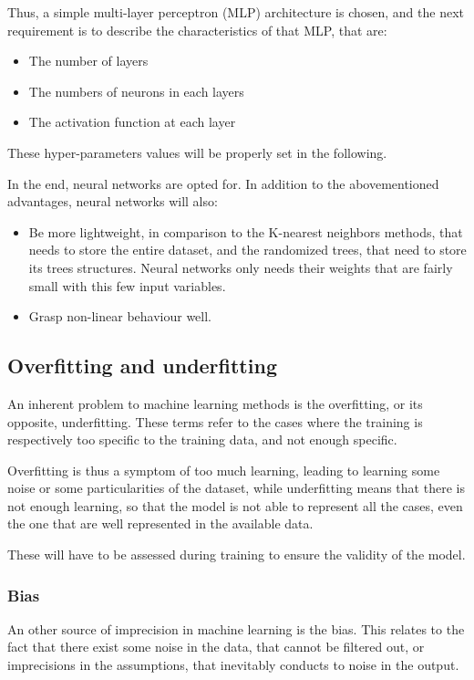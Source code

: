 Thus, a simple multi-layer perceptron (MLP) architecture is chosen, and the next requirement is to describe the characteristics of that MLP, that are:
\begin{itemize}
    \item The number of layers
    \item The numbers of neurons in each layers
    \item The activation function at each layer
\end{itemize}

These hyper-parameters values will be properly set in the following.

In the end, neural networks are opted for. In addition to the abovementioned advantages, neural networks will also:
\begin{itemize}
    \item Be more lightweight, in comparison to the K-nearest neighbors methods, that needs to store the entire dataset, and the randomized trees, that need to store its trees structures. Neural networks only needs their weights that are fairly small with this few input variables.
    \item Grasp non-linear behaviour well.
\end{itemize}

\subsection{Overfitting and underfitting}

An inherent problem to machine learning methods is the overfitting, or its opposite, underfitting. These terms refer to the cases where the training is respectively too specific to the training data, and not enough specific.

Overfitting is thus a symptom of too much learning, leading to learning some noise or some particularities of the dataset, while underfitting means that there is not enough learning, so that the model is not able to represent all the cases, even the one that are well represented in the available data.

These will have to be assessed during training to ensure the validity of the model.

\subsubsection{Bias}

An other source of imprecision in machine learning is the bias. This relates to the fact that there exist some noise in the data, that cannot be filtered out, or imprecisions in the assumptions, that inevitably conducts to noise in the output.

